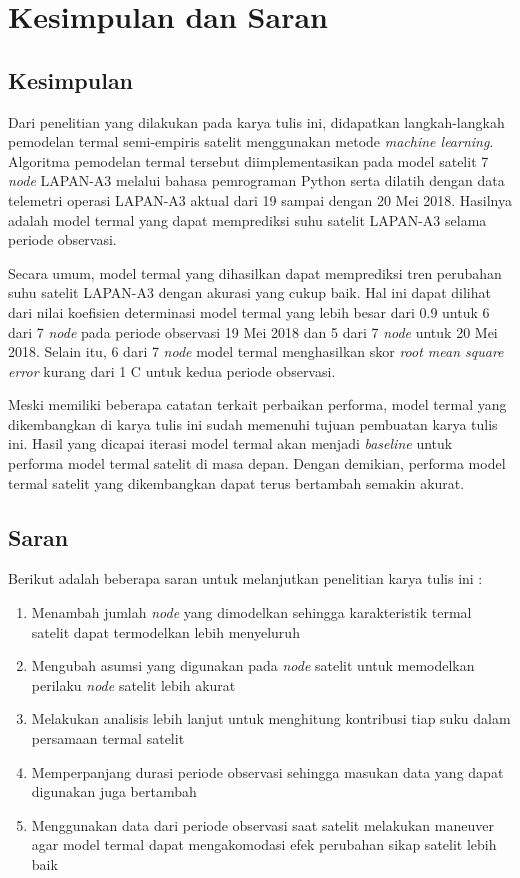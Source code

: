 \chapter{Kesimpulan dan Saran}

\section{Kesimpulan}

Dari penelitian yang dilakukan pada karya tulis ini, didapatkan langkah-langkah
pemodelan termal semi-empiris satelit menggunakan metode \textit{machine learning}.
Algoritma pemodelan termal tersebut diimplementasikan pada model satelit 7 \textit{node}
LAPAN-A3 melalui bahasa pemrograman Python serta dilatih dengan data telemetri
operasi LAPAN-A3 aktual dari 19 sampai dengan 20 Mei 2018. Hasilnya adalah model
termal yang dapat memprediksi suhu satelit LAPAN-A3 selama periode
observasi.

Secara umum, model termal yang dihasilkan dapat memprediksi tren perubahan suhu satelit LAPAN-A3 dengan akurasi yang cukup baik. Hal ini dapat
dilihat dari nilai koefisien determinasi model termal yang lebih besar dari 0.9
untuk 6 dari 7 \textit{node} pada periode observasi 19 Mei 2018 dan 5 dari 7 \textit{node} untuk
20 Mei 2018. Selain itu, 6 dari 7 \textit{node} model termal menghasilkan skor
\textit{root mean square error} kurang dari 1 \degree C untuk kedua periode observasi. 

Meski memiliki beberapa catatan terkait perbaikan performa, model termal yang
dikembangkan di karya tulis ini sudah memenuhi tujuan pembuatan karya tulis
ini. Hasil yang dicapai iterasi model termal akan menjadi \textit{baseline}
untuk performa model termal satelit di masa depan. Dengan demikian, performa
model termal satelit yang dikembangkan dapat terus bertambah semakin akurat.

\section{Saran}

Berikut adalah beberapa saran untuk melanjutkan penelitian karya tulis ini :

\begin{enumerate}
\item Menambah jumlah \textit{node} yang dimodelkan sehingga karakteristik termal satelit dapat termodelkan lebih menyeluruh
\item Mengubah asumsi yang digunakan pada \textit{node} satelit untuk memodelkan perilaku \textit{node} satelit lebih akurat
\item Melakukan analisis lebih lanjut untuk menghitung kontribusi tiap suku dalam persamaan termal satelit
\item Memperpanjang durasi periode observasi sehingga masukan data yang dapat digunakan juga bertambah
\item Menggunakan data dari periode observasi saat satelit melakukan maneuver agar model termal dapat mengakomodasi efek perubahan sikap satelit lebih baik
\end{enumerate}
